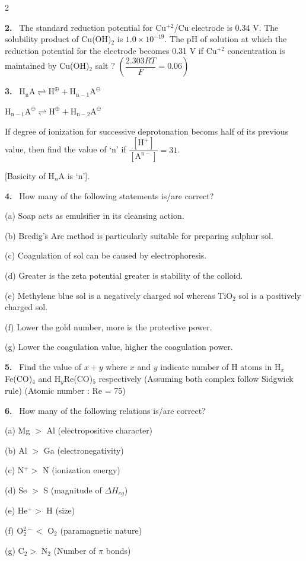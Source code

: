 \documentclass[10pt]{extarticle}
\newcommand{\qn}[1]{\par\smallskip\noindent\textbf{#1.}~}
\begin{document}
\begin{multicols}{2}
\qn{2} The standard reduction potential for Cu$^{+2}$/Cu electrode is 0.34 V. The solubility product of Cu(OH)$_2$ is $1.0\times10^{-19}$. The pH of solution at which the reduction potential for the electrode becomes 0.31 V if Cu$^{+2}$ concentration is maintained by Cu(OH)$_2$ salt ? $\left(\dfrac{2.303RT}{F}=0.06\right)$

\qn{3} $\mathrm{H_nA\rightleftharpoons H^{\oplus}+H_{n-1}A^{\ominus}}$

$\mathrm{H_{n-1}A^{\ominus}\rightleftharpoons H^{\oplus}+H_{n-2}A^{\ominus}}$

If degree of ionization for successive deprotonation becoms half of its previous value, then find the value of `n' if $\dfrac{[\mathrm{H^+}]}{[\mathrm{A^{n-}}]}=31$.

[Basicity of H$_n$A is `n'].

\qn{4} How many of the following statements is/are correct?

(a) Soap acts as emulsifier in its cleansing action.

(b) Bredig's Arc method is particularly suitable for preparing sulphur sol.

(c) Coagulation of sol can be caused by electrophoresis.

(d) Greater is the zeta potential greater is stability of the colloid.

(e) Methylene blue sol is a negatively charged sol whereas TiO$_2$ sol is a positively charged sol.

(f) Lower the gold number, more is the protective power.

(g) Lower the coagulation value, higher the coagulation power.

\qn{5} Find the value of $x+y$ where $x$ and $y$ indicate number of H atoms in H$_x$Fe(CO)$_4$ and H$_y$Re(CO)$_5$ respectively (Assuming both complex follow Sidgwick rule) (Atomic number : Re = 75)

\qn{6} How many of the following relations is/are correct?

(a) Mg $>$ Al (electropositive character)

(b) Al $>$ Ga (electronegativity)

(c) N$^+>$ N (ionization energy)

(d) Se $>$ S (magnitude of $\Delta H_{eg}$)

(e) He$^+>$ H (size)

(f) O$_2^{2-}<$ O$_2$ (paramagnetic nature)

(g) C$_2>$ N$_2$ (Number of $\pi$ bonds)


\end{multicols}
\end{document}
